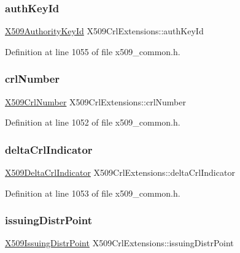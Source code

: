\subsubsection{\texorpdfstring{auth\+Key\+Id}{authKeyId}}
{\footnotesize\ttfamily \hyperlink{structX509AuthorityKeyId}{X509\+Authority\+Key\+Id} X509\+Crl\+Extensions\+::auth\+Key\+Id}



Definition at line 1055 of file x509\+\_\+common.\+h.

\mbox{\label{structX509CrlExtensions_a1c4443888eafec771d558ee4485ffcb7}} 
\subsubsection{\texorpdfstring{crl\+Number}{crlNumber}}
{\footnotesize\ttfamily \hyperlink{structX509CrlNumber}{X509\+Crl\+Number} X509\+Crl\+Extensions\+::crl\+Number}



Definition at line 1052 of file x509\+\_\+common.\+h.

\mbox{\label{structX509CrlExtensions_adfaf2ba762fb10d96abd445936f6fb58}} 
\subsubsection{\texorpdfstring{delta\+Crl\+Indicator}{deltaCrlIndicator}}
{\footnotesize\ttfamily \hyperlink{structX509DeltaCrlIndicator}{X509\+Delta\+Crl\+Indicator} X509\+Crl\+Extensions\+::delta\+Crl\+Indicator}



Definition at line 1053 of file x509\+\_\+common.\+h.

\mbox{\label{structX509CrlExtensions_a7257319dbcfa75fe2671c04d6af33b20}} 
\subsubsection{\texorpdfstring{issuing\+Distr\+Point}{issuingDistrPoint}}
{\footnotesize\ttfamily \hyperlink{structX509IssuingDistrPoint}{X509\+Issuing\+Distr\+Point} X509\+Crl\+Extensions\+::issuing\+Distr\+Point}



